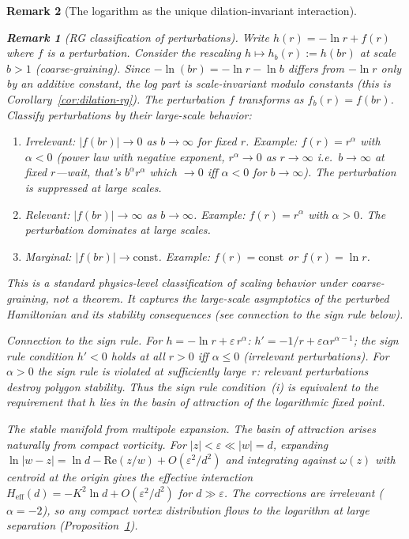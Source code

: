 \documentclass[12pt, a4paper]{article}
\newtheorem{remark}{Remark}[section]
\numberwithin{equation}{section}
\begin{document}
\begin{remark}[The logarithm as the unique dilation-invariant interaction]
\begin{remark}[RG classification of perturbations]
\label{prop:rg-classification}
Write $h(r) = -\ln r + f(r)$ where $f$ is a perturbation.
Consider the rescaling $h \mapsto h_b(r) := h(br)$ at scale $b > 1$
(coarse-graining).  Since $-\ln(br) = -\ln r - \ln b$ differs from
$-\ln r$ only by an additive constant, the log part is
\emph{scale-invariant} modulo constants (this is
Corollary~\ref{cor:dilation-rg}).  The perturbation $f$ transforms
as $f_b(r) = f(br)$.
Classify perturbations by their large-scale behavior:
\begin{enumerate}
  \item \emph{Irrelevant}: $|f(br)| \to 0$ as $b \to \infty$ for
    fixed $r$.  Example: $f(r) = r^\alpha$ with $\alpha < 0$
    (power law with negative exponent, $r^\alpha \to 0$ as $r \to \infty$
    i.e.\ $b \to \infty$ at fixed $r$---wait, that's $b^\alpha r^\alpha$
    which $\to 0$ iff $\alpha < 0$ for $b \to \infty$).
    The perturbation is suppressed at large scales.
  \item \emph{Relevant}: $|f(br)| \to \infty$ as $b \to \infty$.
    Example: $f(r) = r^\alpha$ with $\alpha > 0$.  The perturbation
    dominates at large scales.
  \item \emph{Marginal}: $|f(br)| \to \mathrm{const}$.  Example:
    $f(r) = \mathrm{const}$ or $f(r) = \ln r$.
\end{enumerate}
This is a standard physics-level classification of scaling behavior
under coarse-graining, not a theorem.  It captures the large-scale
asymptotics of the perturbed Hamiltonian and its stability
consequences (see connection to the sign rule below).
\end{remark}

\noindent\emph{Connection to the sign rule.}
For $h = -\ln r + \varepsilon\,r^\alpha$:
$h' = -1/r + \varepsilon\alpha r^{\alpha-1}$;
the sign rule condition $h' < 0$ holds at all $r > 0$ iff
$\alpha \le 0$ (irrelevant perturbations).  For $\alpha > 0$ the
sign rule is violated at sufficiently large~$r$:
\emph{relevant perturbations destroy polygon stability}.
Thus the sign rule condition~(i) is equivalent to the requirement
that $h$ lies in the \emph{basin of attraction} of the logarithmic
fixed point.

\smallskip
\noindent\emph{The stable manifold from multipole expansion.}
The basin of attraction arises naturally from compact vorticity.
For $|z|<\varepsilon\ll|w|=d$, expanding
$\ln|w-z| = \ln d - \mathrm{Re}(z/w) + O(\varepsilon^2/d^2)$
and integrating against $\omega(z)$ with centroid at the origin
gives the effective interaction
$H_\mathrm{eff}(d)=-K^2\ln d + O(\varepsilon^2/d^2)$ for
$d\gg\varepsilon$.  The corrections are irrelevant ($\alpha = -2$),
so \emph{any compact vortex distribution flows to the logarithm
at large separation} (Proposition~\ref{prop:rg-classification}).


\end{remark}
\end{document}
